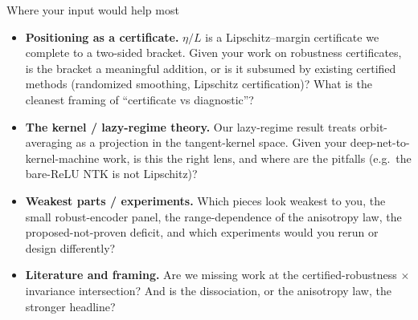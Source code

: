 \documentclass[aspectratio=169,10pt]{beamer}
\newcommand{\etaL}{\ensuremath{\eta/L}}
\newcommand{\key}[1]{{\color{TUMdarker}\bfseries #1}}
\begin{document}
\begin{frame}{Where your input would help most}{}
  \vspace{0.3em}
  \begin{itemize}\footnotesize\itemsep5pt
    \item \key{Positioning as a certificate.} $\etaL$ is a Lipschitz--margin certificate we complete to a
      two-sided bracket. Given your work on robustness certificates, is the bracket a meaningful addition,
      or is it subsumed by existing certified methods (randomized smoothing, Lipschitz certification)?
      What is the cleanest framing of ``certificate vs diagnostic''?
    \item \key{The kernel / lazy-regime theory.} Our lazy-regime result treats orbit-averaging as a
      projection in the tangent-kernel space. Given your deep-net-to-kernel-machine work, is this the
      right lens, and where are the pitfalls (e.g.\ the bare-ReLU NTK is not Lipschitz)?
    \item \key{Weakest parts / experiments.} Which pieces look weakest to you, the small robust-encoder
      panel, the range-dependence of the anisotropy law, the proposed-not-proven deficit, and which
      experiments would you rerun or design differently?
    \item \key{Literature and framing.} Are we missing work at the certified-robustness $\times$
      invariance intersection? And is the dissociation, or the anisotropy law, the stronger headline?
  \end{itemize}
\end{frame}
\end{document}
